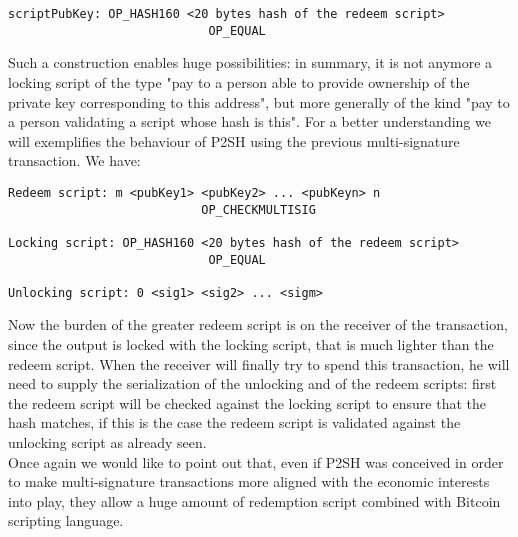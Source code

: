 \bigskip

\begin{lstlisting}[frame=single]
scriptPubKey: OP_HASH160 <20 bytes hash of the redeem script> 
							OP_EQUAL
\end{lstlisting}

\bigskip
\noindent
Such a construction enables huge possibilities: in summary, it is not anymore a locking script of the type "pay to a person able to provide ownership of the private key corresponding to this address", but more generally of the kind "pay to a person validating a script whose hash is this".
For a better understanding we will exemplifies the behaviour of P2SH using the previous multi-signature transaction.
We have:

\bigskip

\begin{lstlisting}[frame=single]
Redeem script: m <pubKey1> <pubKey2> ... <pubKeyn> n
 						   OP_CHECKMULTISIG
 						   
Locking script: OP_HASH160 <20 bytes hash of the redeem script> 
						    OP_EQUAL
						    
Unlocking script: 0 <sig1> <sig2> ... <sigm>
\end{lstlisting}

\bigskip
\noindent
Now the burden of the greater redeem script is on the receiver of the transaction, since the output is locked with the locking script, that is much lighter than the redeem script. When the receiver will finally try to spend this transaction, he will need to supply the serialization of the unlocking and of the redeem scripts: first the redeem script will be checked against the locking script to ensure that the hash matches, if this is the case the redeem script is validated against the unlocking script as already seen.
\\
Once again we would like to point out that, even if P2SH was conceived in order to make multi-signature transactions more aligned with the economic interests into play, they allow a huge amount of redemption script combined with Bitcoin scripting language.